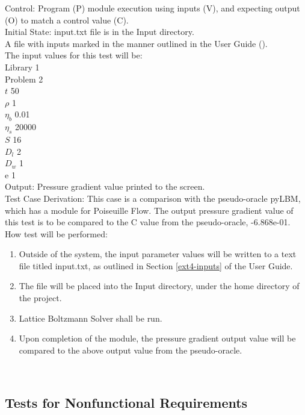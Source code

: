 \documentclass[12pt, titlepage]{article}
\newcommand{\famname}{Lattice Boltzmann Solver}
\begin{document}
\begin{enumerate}
Control: Program (P) module execution using inputs (V), and expecting output (O)
to match a control value (C).\\
					
Initial State: input.txt file is in the Input directory.\\
					
A file with inputs marked in the manner outlined in the User
Guide (\citet{LBM_UserGuide_PM}).\\The input values for this test will be:\\
Library 1\\
Problem 2\\
$t$ 50\\
$\rho$ 1\\
$\eta_b$ 0.01\\
$\eta_s$ 20000\\
$S$ 16\\
$D_{l}$ 2\\
$D_{w}$ 1\\
$\mathrm{e}$ 1\\
					
Output: Pressure gradient value printed to the screen. \\ 

Test Case Derivation: This case is a comparison with the pseudo-oracle pyLBM,
which has a module for Poiseuille Flow. The output pressure gradient value of
this test is to be compared to the C value from the pseudo-oracle,
-6.868e-01.\\
					
How test will be performed: 

\begin{enumerate}
\item Outside of the system, the input parameter values will be written to a text file titled input.txt, as outlined in Section \ref{ext4-inputs} of the User Guide.
\item The file will be placed into the Input directory, under the home directory
of the project.
\item {\famname} shall be run.
\item Upon completion of the module, the pressure gradient output value will be
compared to the above output value from the pseudo-oracle.
\end{enumerate}	

\end{enumerate}

~\newpage

\subsection{Tests for Nonfunctional Requirements}
\label{nfrtest}
\end{document}
